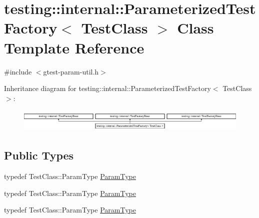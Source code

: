 \hypertarget{classtesting_1_1internal_1_1_parameterized_test_factory}{}\section{testing\+::internal\+::Parameterized\+Test\+Factory$<$ Test\+Class $>$ Class Template Reference}
\label{classtesting_1_1internal_1_1_parameterized_test_factory}


{\ttfamily \#include $<$gtest-\/param-\/util.\+h$>$}

Inheritance diagram for testing\+::internal\+::Parameterized\+Test\+Factory$<$ Test\+Class $>$\+:\begin{figure}[H]
\begin{center}
\leavevmode
\includegraphics[height=1.111111cm]{d6/d54/classtesting_1_1internal_1_1_parameterized_test_factory}
\end{center}
\end{figure}
\subsection*{Public Types}
\begin{DoxyCompactItemize}
\item 
typedef Test\+Class\+::\+Param\+Type \mbox{\hyperlink{classtesting_1_1internal_1_1_parameterized_test_factory_ad9a27b8e1a83de2f1687625bccff460d}{Param\+Type}}
\item 
typedef Test\+Class\+::\+Param\+Type \mbox{\hyperlink{classtesting_1_1internal_1_1_parameterized_test_factory_ad9a27b8e1a83de2f1687625bccff460d}{Param\+Type}}
\item 
typedef Test\+Class\+::\+Param\+Type \mbox{\hyperlink{classtesting_1_1internal_1_1_parameterized_test_factory_ad9a27b8e1a83de2f1687625bccff460d}{Param\+Type}}
\end{DoxyCompactItemize}
